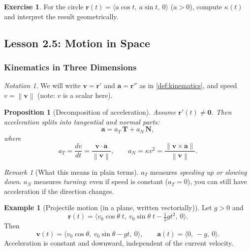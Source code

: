 \documentclass[12pt]{article}
\numberwithin{equation}{section}
\newcommand{\vect}[1]{\boldsymbol{#1}}   %
\newcommand{\norm}[1]{\left\lVert #1\right\rVert}
\theoremstyle{plain}
\newtheorem{proposition}[theorem]{Proposition}
\theoremstyle{definition}
\newtheorem{example}[theorem]{Example}
\newtheorem{exercise}[theorem]{Exercise}
\theoremstyle{remark}
\newtheorem{remark}[theorem]{Remark}
\newtheorem{notation}[theorem]{Notation}
\begin{document}
\begin{exercise}
For the circle $\vect r(t)=\langle a\cos t,\ a\sin t,\ 0\rangle$ ($a>0$), compute $\kappa(t)$ and interpret the result geometrically.
\end{exercise}


\subsection{Lesson 2.5: Motion in Space}

\subsubsection{Kinematics in Three Dimensions}

\begin{notation}
We will write $\vect v=\vect r'$ and $\vect a=\vect r''$ as in \cref{def:kinematics}, and speed $v=\norm{\vect v}$ (note: $v$ is a scalar here).
\end{notation}

\begin{proposition}[Decomposition of acceleration]\label{prop:acc-decomp}
Assume $\vect r'(t)\neq \vect 0$. Then acceleration splits into tangential and normal parts:
\begin{equation}\label{eq:acc-decomp}
\vect a = a_T\,\vect T + a_N\,\vect N,
\end{equation}
where
\begin{equation}\label{eq:aT}
a_T=\frac{dv}{dt}=\frac{\vect v\cdot \vect a}{\norm{\vect v}},
\qquad
a_N=\kappa v^2=\frac{\norm{\vect v\times \vect a}}{\norm{\vect v}}.
\end{equation}
\end{proposition}

\begin{remark}[What this means in plain terms]
$a_T$ measures \emph{speeding up or slowing down}.  
$a_N$ measures \emph{turning}: even if speed is constant ($a_T=0$), you can still have acceleration if the direction changes.
\end{remark}

\begin{example}[Projectile motion (in a plane, written vectorially)]
Let $g>0$ and
\[
\vect r(t)=\langle v_0\cos\theta\; t,\ v_0\sin\theta\; t-\tfrac12 g t^2,\ 0\rangle.
\]
Then
\[
\vect v(t)=\langle v_0\cos\theta,\ v_0\sin\theta-gt,\ 0\rangle,\qquad
\vect a(t)=\langle 0,\ -g,\ 0\rangle.
\]
Acceleration is constant and downward, independent of the current velocity.
\end{example}
\end{document}

